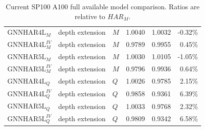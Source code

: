 \begin{table}[H]
{\begin{tabular}{lllrrr}
\(\mathrm{GNNHAR4L}_{M}\) & depth extension & \(M\) & 1.0040 & 1.0032 & -0.32\% \\
\(\mathrm{GNNHAR4L}_{M}^{IV}\) & depth extension & \(M\) & 0.9789 & 0.9955 & 0.45\% \\
\(\mathrm{GNNHAR5L}_{M}\) & depth extension & \(M\) & 1.0030 & 1.0105 & -1.05\% \\
\(\mathrm{GNNHAR5L}_{M}^{IV}\) & depth extension & \(M\) & 0.9796 & 0.9936 & 0.64\% \\
\(\mathrm{GNNHAR4L}_{Q}\) & depth extension & \(Q\) & 1.0026 & 0.9785 & 2.15\% \\
\(\mathrm{GNNHAR4L}_{Q}^{IV}\) & depth extension & \(Q\) & 0.9858 & 0.9361 & 6.39\% \\
\(\mathrm{GNNHAR5L}_{Q}\) & depth extension & \(Q\) & 1.0033 & 0.9768 & 2.32\% \\
\(\mathrm{GNNHAR5L}_{Q}^{IV}\) & depth extension & \(Q\) & 0.9809 & 0.9342 & 6.58\% \\
\bottomrule
\end{tabular}
}
\caption{Current SP100 A100 full available model comparison.  Ratios are relative to \(HAR_M\).}
\label{tab:sp100-a100-full-loss}
\end{table}
